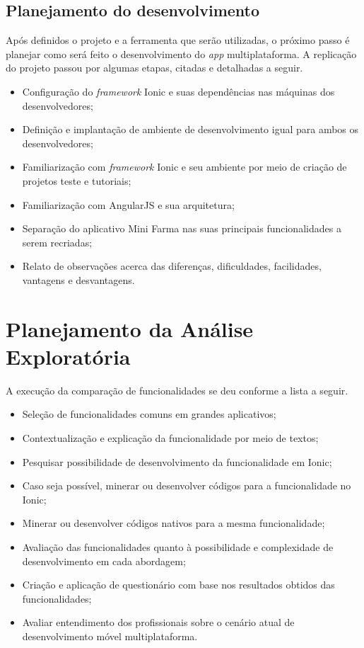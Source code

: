 \subsection{Planejamento do desenvolvimento} \label{subsection:planejamentodesenvolvimento}

Após definidos o projeto e a ferramenta que serão utilizadas, o próximo passo é planejar como será feito o desenvolvimento do \textit{app} multiplataforma. 
A replicação do projeto passou por algumas etapas, citadas e detalhadas a seguir.

\begin{itemize}
    \item Configuração do \textit{framework} Ionic e suas dependências nas máquinas dos desenvolvedores;
    \item Definição e implantação de ambiente de desenvolvimento igual para ambos os desenvolvedores;
    \item Familiarização com \textit{framework} Ionic e seu ambiente por meio de criação de projetos teste e tutoriais;
    \item Familiarização com AngularJS e sua arquitetura; 
    \item Separação do aplicativo Mini Farma nas suas principais funcionalidades a serem recriadas;
    \item Relato de observações acerca das diferenças, dificuldades, facilidades, vantagens e desvantagens.
\end{itemize}

\section{Planejamento da Análise Exploratória} \label{section:planejamentoanaliseexp}
A execução da comparação de funcionalidades se deu conforme a lista a seguir.

\begin{itemize}
    \item Seleção de funcionalidades comuns em grandes aplicativos;
    \item Contextualização e explicação da funcionalidade por meio de textos;
    \item Pesquisar possibilidade de desenvolvimento da funcionalidade em Ionic;
    \item Caso seja possível, minerar ou desenvolver códigos para a funcionalidade no Ionic;
    \item Minerar ou desenvolver códigos nativos para a mesma funcionalidade;
    \item Avaliação das funcionalidades quanto à possibilidade e complexidade de desenvolvimento em cada abordagem;
    \item Criação e aplicação de questionário com base nos resultados obtidos das funcionalidades;
    \item Avaliar entendimento dos profissionais sobre o cenário atual de desenvolvimento móvel multiplataforma.
\end{itemize}

